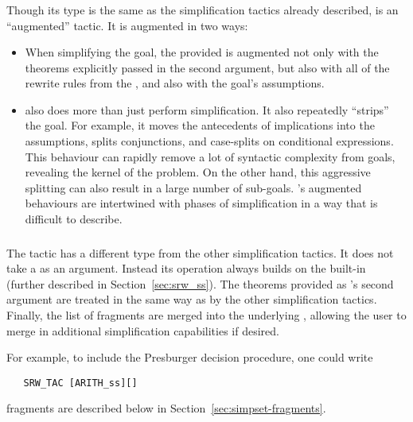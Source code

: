 \subsubsection{}

Though its type is the same as the simplification tactics already
described,  is an ``augmented'' tactic.  It is augmented
in two ways:
\begin{itemize}
\item When simplifying the goal, the provided \simpset{} is augmented
  not only with the theorems explicitly passed in the second argument,
  but also with all of the rewrite rules from the , and
  also with the goal's assumptions.
%
\item {} also does more than just perform simplification.
  It also repeatedly ``strips'' the goal.  For example, it moves the
  antecedents of implications into the assumptions, splits
  conjunctions, and case-splits on conditional expressions.  This
  behaviour can rapidly remove a lot of syntactic complexity from
  goals, revealing the kernel of the problem.  On the other hand, this
  aggressive splitting can also result in a large number of
  sub-goals.  's augmented behaviours are intertwined with
  phases of simplification in a way that is difficult to describe.
\end{itemize}

\subsubsection{}

The tactic  has a different type from the other
simplification tactics.  It does not take a \simpset{} as an argument.
Instead its operation always builds on the built-in \simpset{}
 (further described in Section~\ref{sec:srw_ss}).  The
theorems provided as 's second argument are treated in
the same way as by the other simplification tactics.  Finally, the
list of \simpset{} fragments are merged into the underlying
\simpset{}, allowing the user to merge in additional simplification
capabilities if desired.

For example, to include the Presburger decision procedure, one could
write
\begin{hol}
\begin{verbatim}
   SRW_TAC [ARITH_ss][]
\end{verbatim}
\end{hol}
\Simpset{} fragments are described below in
Section~\ref{sec:simpset-fragments}.

